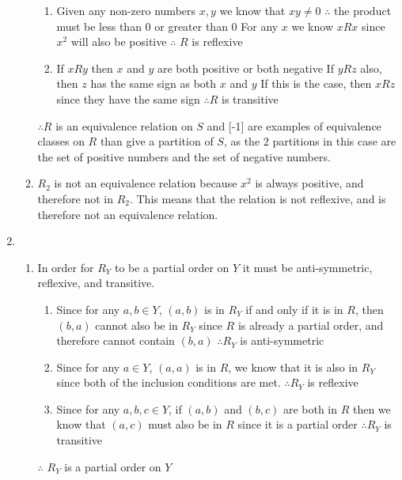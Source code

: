 \documentclass{article}
\begin{document}
\begin{enumerate}
\begin{enumerate}
\begin{enumerate}
				\item Given any non-zero numbers $x,y$ we know that $xy\neq0$
				\newline $\therefore$ the product must be less than 0 or greater than 0
				\newline For any $x$ we know $xRx$ since $x^2$ will also be positive
				\newline $\therefore$ $R$ is reflexive
				
				\item If $xRy$ then $x$ and $y$ are both positive or both negative
				\newline If $yRz$ also, then $z$ has the same sign as both $x$ and $y$
				\newline If this is the case, then $xRz$ since they have the same sign
				\newline $\therefore R$ is transitive
			\end{enumerate}
			$\therefore R$ is an equivalence relation on $S$
			\newline [1] and [-1] are examples of equivalence classes on $R$ than give a partition of $S$, as the 2 partitions in this case are the set of positive numbers and the set of negative numbers.
			
			\item $R_2$ is not an equivalence relation because $x^2$ is always positive, and therefore not in $R_2$. This means that the relation is not reflexive, and is therefore not an equivalence relation.
		\end{enumerate}
		
		\item
		\begin{enumerate}
			\item In order for $R_Y$ to be a partial order on $Y$ it must be anti-symmetric, reflexive, and transitive.
			\begin{enumerate}
				\item Since for any $a,b\in Y$, $(a,b)$ is in $R_Y$ if and only if it is in $R$, then $(b,a)$ cannot also be in $R_Y$ since $R$ is already a partial order, and therefore cannot contain $(b,a)$
				\newline $\therefore R_Y$ is anti-symmetric
				
				\item Since for any $a\in Y$, $(a,a)$ is in $R$, we know that it is also in $R_Y$ since both of the inclusion conditions are met.
				\newline $\therefore R_Y$ is reflexive
				
				\item Since for any $a,b,c\in Y$, if $(a,b)$ and $(b,c)$ are both in $R$ then we know that $(a,c)$ must also be in $R$ since it is a partial order
				\newline $\therefore R_Y$ is transitive
			\end{enumerate}
			$\therefore$ $R_Y$ is a partial order on $Y$
		\end{enumerate}
		
	\end{enumerate}
\end{document}
